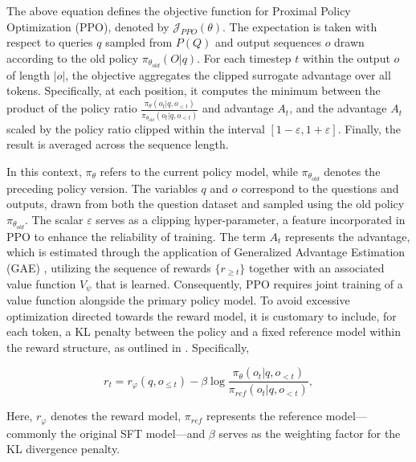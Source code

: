 \begin{itemize}[topsep=0pt]
\begin{itemize}[topsep=0pt]
The above equation defines the objective function for Proximal Policy Optimization (PPO), denoted by $\mathcal{J}_{PPO}(\theta)$. The expectation is taken with respect to queries $q$ sampled from $P(Q)$ and output sequences $o$ drawn according to the old policy $\pi_{\theta_{old}}(O|q)$. For each timestep $t$ within the output $o$ of length $|o|$, the objective aggregates the clipped surrogate advantage over all tokens. Specifically, at each position, it computes the minimum between the product of the policy ratio $\frac{\pi_\theta(o_{t} | q, o_{<t})}{\pi_{\theta_{old}}(o_{t} | q, o_{<t})}$ and advantage $A_t$, and the advantage $A_t$ scaled by the policy ratio clipped within the interval $[1 - \varepsilon, 1 + \varepsilon]$. Finally, the result is averaged across the sequence length.

In this context, $\pi_{\theta}$ refers to the current policy model, while $\pi_{\theta_{old}}$ denotes the preceding policy version. The variables $q$ and $o$ correspond to the questions and outputs, drawn from both the question dataset and sampled using the old policy $\pi_{\theta_{old}}$. The scalar $\varepsilon$ serves as a clipping hyper-parameter, a feature incorporated in PPO to enhance the reliability of training. The term $A_t$ represents the advantage, which is estimated through the application of Generalized Advantage Estimation (GAE) \citep{gae}, utilizing the sequence of rewards $\{r_{\ge t}\}$ together with an associated value function $V_{\psi}$ that is learned. Consequently, PPO requires joint training of a value function alongside the primary policy model. To avoid excessive optimization directed towards the reward model, it is customary to include, for each token, a KL penalty between the policy and a fixed reference model within the reward structure, as outlined in \citep{ouyang2022training}. Specifically,

\begin{equation}
    r_{t} = r_\varphi(q, o_{\le t}) - \beta \log\frac{\pi_{\theta}(o_{t}|q, o_{<t})}{\pi_{ref}(o_{t}|q, o_{<t})},
\label{eq:PPO-reward}
\end{equation}

Here, $r_\varphi$ denotes the reward model, $\pi_{ref}$ represents the reference model—commonly the original SFT model—and $\beta$ serves as the weighting factor for the KL divergence penalty.


\end{itemize}
\end{itemize}

